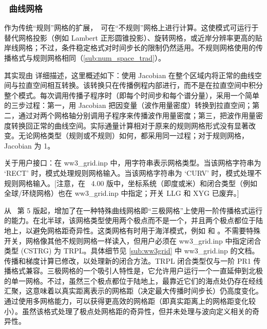 \vssub
\subsubsection{~曲线网格} \label{sub:num_space_curv}

\noindent 
作为传统“规则”网格的扩展，\ws\ 可在“不规则”网格上进行计算。这使模式可运行于替代网格投影（例如 Lambert 正形圆锥投影）、旋转网格，或近岸分辨率更高的贴岸线网格；不过，条件稳定格式对时间步长的限制仍然适用。不规则网格使用的传播格式与规则网格相同（\para\ref{sub:num_space_trad}）。

其实现由 \cite{rep:RC09} 详细描述，这里概述如下：使用 Jacobian 在整个区域内将正常的曲线空间与拉直空间相互转换。该转换只在传播例程内部进行，而不是在拉直空间中积分整个模式。每次调用传播子程序时（即每个时间步和每个谱分量），采用一个简单的三步过程：第一，用 Jacobian 把因变量（波作用量密度）转换到拉直空间；第二，通过对两个网格轴分别调用子程序来传播波作用量密度；第三，把波作用量密度转换回正常的曲线空间。实际通量计算相对于原来的规则网格形式没有显著改变。无论网格类型（规则或不规则）如何，都采用同一过程；对于规则网格，Jacobian 为 1。

关于用户接口：在 {\file ww3\_grid.inp} 中，用字符串表示网格类型。当该网格字符串为 `{\code RECT}' 时，模式处理规则网格输入。当该网格字符串为 `{\code CURV}' 时，模式处理不规则网格输入。[注意，在 \ws\ 4.00 版中，坐标系统（即度或米）和闭合类型（例如全球/环绕网格）也在 {\file ww3\_grid.inp} 中指定；开关 {\code LLG} 和 {\code XYG} 已废弃。]

从 \ws\ 第 5 版起，增加了在一种特殊曲线网格即“三极网格”上使用一阶传播格式运行的能力。在北半球，该网格类型使用两个极点而不是一个，并且两个极点都位于陆地上，以避免网格距奇异性。这类网格有时用于海洋模式，例如 \citep{art:Murr96} 和 \citep{art:Metz14}。不需要特殊开关，网格像其他不规则网格一样读入，但用户必须在 {\file ww3\_grid.inp} 中指定闭合类型 ({\code CSTRG}) 为 {\code TRPL}。具体细节见 \para\ref{sub:ww3grid} 中 {\file ww3\_grid.inp} 的文档。传播和梯度计算已修改，以处理新的闭合方法。{\code TRPL} 闭合类型仅与一阶 {\code PR1} 传播格式兼容。三极网格的一个吸引人特性是，它允许用户运行一个一直延伸到北极的单一网格。不过，虽然三个极点都位于陆地上，最靠近它们的海点处仍存在经线汇聚，这意味着以真实距离表示的网格距（决定最大传播时间步长）仍高度变化。通过使用多网格能力，可以获得更高效的网格距（即真实距离上的网格距变化较小）。虽然该格式处理了极点处网格距的奇异性，但并未处理与波向定义相关的奇异性。
